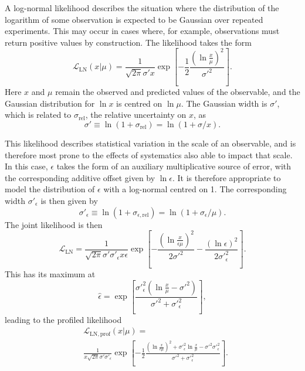 \documentclass[pdftex,twocolumn,epjc3_preprint,runningheads]{svjour3}
\renewcommand{\_}{\discretionary{\underscore}{}{\underscore}}
\begin{document}
A log-normal likelihood describes the situation where the distribution of the logarithm of some observation is expected to be Gaussian over repeated experiments. This may occur in cases where, for example, observations must return positive values by construction.  The likelihood takes the form
\begin{equation}
\mathcal{L}_\mathrm{LN}(x|\mu) = \frac{1}{\sqrt{2\pi}\sigma' x} \exp\left[-\frac12\frac{(\ln \frac{x}{\mu} )^2}{\sigma'^2}\right].
\end{equation}
Here $x$ and $\mu$ remain the observed and predicted values of the observable, and the Gaussian distribution for $\ln x$ is centred on $\ln \mu$.  The Gaussian width is $\sigma'$, which is related to $\sigma_\mathrm{rel}$, the relative uncertainty on $x$, as
\begin{equation}
\sigma' \equiv \ln(1+\sigma_\mathrm{rel}) =  \ln(1+\sigma/x).
\end{equation}

This likelihood describes statistical variation in the scale of an observable, and is therefore most prone to the effects of systematics also able to impact that scale.  In this case, $\epsilon$ takes the form of an auxiliary multiplicative source of error, with the corresponding additive offset given by $\ln \epsilon$.  It is therefore appropriate to model the distribution of $\epsilon$ with a log-normal centred on 1.  The corresponding width $\sigma'_\epsilon$ is then given by
\begin{equation}
\sigma'_\epsilon \equiv \ln(1+\sigma_{\epsilon,\mathrm{rel}}) =  \ln(1+\sigma_\epsilon/\mu).
\end{equation}
The joint likelihood is then
\begin{equation}
\label{lognormal_joint_likelihood}
\mathcal{L}_\mathrm{LN} = \frac{1}{\sqrt{2\pi}\sigma'\sigma'_\epsilon x\epsilon} \exp\left[-\frac{(\ln \frac{x}{\epsilon\mu} )^2}{2\sigma'^2} - \frac{(\ln \epsilon )^2}{2\sigma'^2_\epsilon}\right].
\end{equation}
This has its maximum at
\begin{equation}
\hat\epsilon = \exp\left[\frac{\sigma'^2_\epsilon(\ln\frac{x}{\mu} - \sigma'^2)}{\sigma'^2 + \sigma'^2_\epsilon}\right],
\end{equation}
leading to the profiled likelihood
\begin{align}
\label{lognormal_prof}
&\mathcal{L}_\mathrm{LN,prof}(x|\mu) = \nonumber\\
&\frac{1}{x\sqrt{2\pi}\sigma'\sigma'_\epsilon} \exp\left[-\frac12\frac{\left(\ln \frac{x}{\epsilon\mu} \right)^2 + \sigma'^2_\epsilon \ln\frac{x}{\mu} - \sigma'^2\sigma'^2_\epsilon  }{\sigma'^2 + \sigma'^2_\epsilon}\right].
\end{align}
\end{document}
